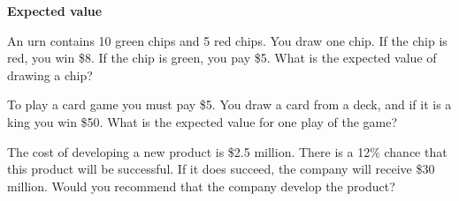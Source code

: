 \documentclass[12pt]{exam}
\begin{document}
\textbf{Expected value}

\begin{questions}
\setcounter{question}{14}
\question
An urn contains 10 green chips and 5 red chips.  You draw one chip.  If the chip is red, you win \$8.  If the chip is green, you pay \$5.  What is the expected value of drawing a chip?

\question 
To play a card game you must pay \$5.  You draw a card from a deck, and if it is a king you win \$50.  What is the expected value for one play of the game?

\question
The cost of developing a new product is \$2.5 million.  There is a 12\% chance that this product will be successful.  If it does succeed, the company will receive \$30 million.  Would you recommend that the company develop the product?
\end{questions}
\end{document}
